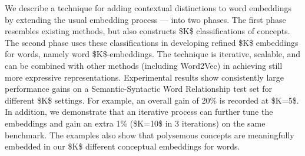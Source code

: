 We describe a technique for adding contextual distinctions to word embeddings by extending the usual embedding process --- into two phases.  The first phase resembles existing methods, but also constructs \$K\$ classifications of concepts.  The second phase uses these classifications in developing refined \$K\$ embeddings for words, namely word \$K\$-embeddings.  The technique is iterative, scalable, and can be combined with other methods (including Word2Vec) in achieving still more expressive representations. Experimental results show consistently large performance gains on a Semantic-Syntactic Word Relationship test set for different \$K\$ settings. For example, an overall gain of 20\% is recorded at \$K=5\$. In addition, we demonstrate that an iterative process can further tune the embeddings and gain an extra 1\% (\$K=10\$ in 3 iterations) on the same benchmark. The examples also show that polysemous concepts are meaningfully embedded in our \$K\$ different conceptual embeddings for words.
